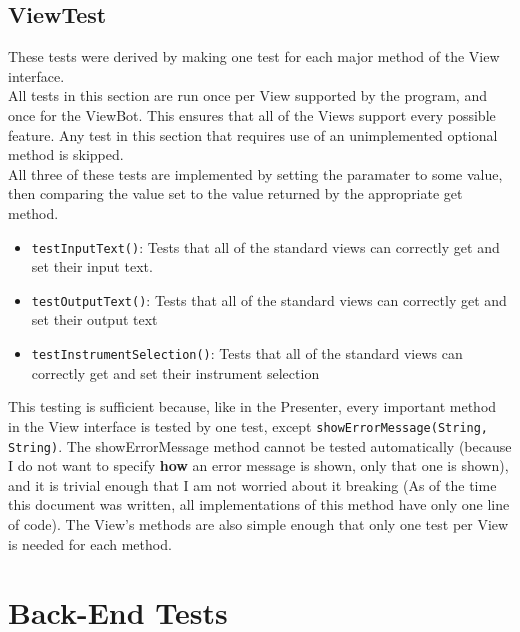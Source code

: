 \documentclass[11pt]{article}
\begin{document}
\subsection{ViewTest}
\label{sec:org118e4e9}
These tests were derived by making one test for each major method of the View interface.\\
All tests in this section are run once per View supported by the program, and once for the ViewBot.  This ensures that all of the Views support every possible feature.  Any test in this section that requires use of an unimplemented optional method is skipped.\\
All three of these tests are implemented by setting the paramater to some value, then comparing the value set to the value returned by the appropriate get method.\\
\begin{itemize}
\item \texttt{testInputText()}: Tests that all of the standard views can correctly get and set their input text.\\
\item \texttt{testOutputText()}: Tests that all of the standard views can correctly get and set their output text\\
\item \texttt{testInstrumentSelection()}: Tests that all of the standard views can correctly get and set their instrument selection\\
\end{itemize}

This testing is sufficient because, like in the Presenter, every important method in the View interface is tested by one test, except \texttt{showErrorMessage(String, String)}.  The showErrorMessage method cannot be tested automatically (because I do not want to specify \textbf{how} an error message is shown, only that one is shown), and it is trivial enough that I am not worried about it breaking (As of the time this document was written, all implementations of this method have only one line of code).  The View's methods are also simple enough that only one test per View is needed for each method.\\
\section{Back-End Tests}
\label{sec:orge168d15}
\end{document}
